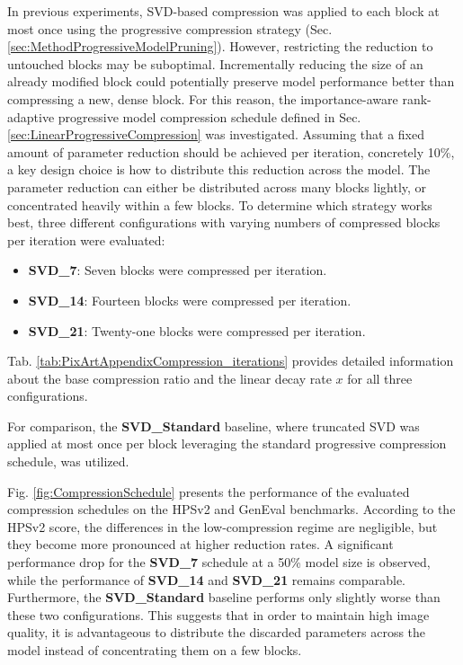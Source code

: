  
In previous experiments, SVD-based compression was applied to each block at most once using the progressive compression strategy (Sec. \ref{sec:MethodProgressiveModelPruning}). However, restricting the reduction to untouched blocks may be suboptimal. Incrementally reducing the size of an already modified block could potentially preserve model performance better than compressing a new, dense block. For this reason, the importance-aware rank-adaptive progressive model compression schedule defined in Sec. \ref{sec:LinearProgressiveCompression} was investigated. Assuming that a fixed amount of parameter reduction should be achieved per iteration, concretely 10\%, a key design choice is how to distribute this reduction across the model. The parameter reduction can either be distributed across many blocks lightly, or concentrated heavily within a few blocks. To determine which strategy works best, three different configurations with varying numbers of compressed blocks per iteration were evaluated:

\begin{itemize}
	\item \textbf{SVD\_7}: Seven blocks were compressed per iteration.
	\item \textbf{SVD\_14}: Fourteen blocks were compressed per iteration.
	\item \textbf{SVD\_21}: Twenty-one blocks were compressed per iteration.
\end{itemize}
Tab. \ref{tab:PixArtAppendixCompression_iterations} provides detailed information about the base compression ratio and the linear decay rate $x$ for all three configurations.

For comparison, the \textbf{SVD\_Standard} baseline, where truncated \gls{SVD} was applied at most once per block leveraging the standard progressive compression schedule, was utilized.

Fig. \ref{fig:CompressionSchedule} presents the performance of the evaluated compression schedules on the HPSv2 and GenEval benchmarks.
According to the HPSv2 score, the differences in the low-compression regime are negligible, but they become more pronounced at higher reduction rates. 
 A significant performance drop for the \textbf{SVD\_7} schedule at a 50\% model size is observed, while the performance of \textbf{SVD\_14} and \textbf{SVD\_21} remains comparable. Furthermore, the \textbf{SVD\_Standard} baseline performs only slightly worse than these two configurations. This suggests that in order to maintain high image quality, it is advantageous to distribute the discarded parameters across the model instead of concentrating them on a few blocks.
 
